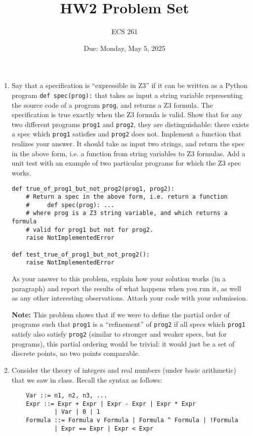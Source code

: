 \documentclass{article}
\begin{document}
\title{HW2 Problem Set}
\author{ECS 261}
\date{Due: Monday, May 5, 2025}

\maketitle

\begin{enumerate}
\item
Say that a specification is ``expressible in Z3'' if it can be written as a Python program \texttt{def spec(prog):} that takes as input a string variable representing the source code of a program \texttt{prog}, and returns a Z3 formula.
The specification is true exactly when the Z3 formula is valid.
Show that for any two different programs \texttt{prog1} and \texttt{prog2},
they are distinguishable: there exists a spec which \texttt{prog1} satisfies and \texttt{prog2} does not.
Implement a function that realizes your answer.
It should take as input two strings, and return the spec in the above form, i.e. a function from string variables to Z3 formulas.
Add a unit test with an example of two particular programs for which the Z3 spec works.
\begin{verbatim}
def true_of_prog1_but_not_prog2(prog1, prog2):
    # Return a spec in the above form, i.e. return a function
    #     def spec(prog): ...
    # where prog is a Z3 string variable, and which returns a formula
    # valid for prog1 but not for prog2.
    raise NotImplementedError

def test_true_of_prog1_but_not_prog2():
    raise NotImplementedError
\end{verbatim}

As your answer to this problem, explain how your solution works (in a paragraph) and report the results of what happens when you run it, as well as any other interesting observations.
Attach your code with your submission.


\textbf{Note:}
This problem shows that if we were to define the partial order of programs such that \texttt{prog1}
is a ``refinement'' of \texttt{prog2} if all specs which \texttt{prog1} satisfy also satisfy \texttt{prog2} (similar to stronger and weaker specs, but for programs), this partial ordering would be trivial: it would just be a set of discrete points, no two points comparable.

\item
Consider the theory of integers and real numbers (under basic arithmetic) that we saw in class.
Recall the syntax as follows:
\begin{verbatim}
    Var ::= n1, n2, n3, ...
    Expr ::= Expr + Expr | Expr - Expr | Expr * Expr
            | Var | 0 | 1
    Formula ::= Formula v Formula | Formula ^ Formula | !Formula
            | Expr == Expr | Expr < Expr
\end{verbatim}


\end{enumerate}
\end{document}
